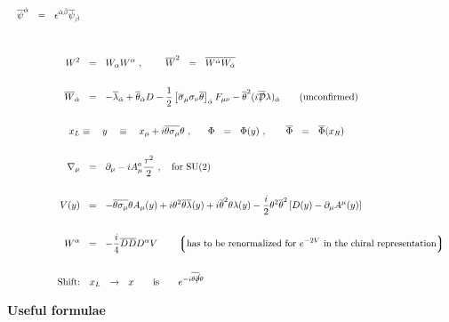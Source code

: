 \documentclass[14pt]{article}
\newcommand{\mc}[1]{\mathcal{#1}}
\newcommand{\ov}{\overline}
\newcommand{\lgr}{\left\lgroup}
\newcommand{\rgr}{\right\rgroup}
\def\slashed#1{\setbox0=\hbox{$#1$}             %
   \dimen0=\wd0                                 %
   \setbox1=\hbox{/} \dimen1=\wd1               %
   \ifdim\dimen0>\dimen1                        %
      \rlap{\hbox to \dimen0{\hfil/\hfil}}      %
      #1                                        %
   \else                                        %
      \rlap{\hbox to \dimen1{\hfil$#1$\hfil}}   %
      /                                         %
   \fi}                                         %
\begin{document}
\begin{align*}
\quad
	    \overline{\psi}^{\dot{\alpha}} ~~=~~ 
			  \epsilon^{\dot{\alpha}\dot{\beta}}
			  \overline{\psi}_{\dot{\beta}}\\ \\
 \\
  W^2 & ~~=~~  W_\alpha W^\alpha~,~~~~~~~ 
    \overline{W}^2 ~~=~~ \overline{W^{\dot{\alpha}} W_{\dot{\alpha}}} \\ \\
  \overline{W}_{\dot{\alpha}} & ~~=~~ 
        - \overline{\lambda}_{\dot{\alpha}} +
	  \overline{\theta}_{\dot{\alpha}} D -
	  \frac{1}{2} \left [ 
	      \overline{\sigma}_\mu\sigma_\nu \overline{\theta}
	              \right ]_{\dot{\alpha}} F_{\mu\nu} -
	  \overline{\theta}^2 (i \ov{\slashed{\mc{D}}}\lambda)_{\dot{\alpha}}
\qquad {\rm (unconfirmed)}  \\ \\
  x_L & \equiv  ~~~y ~~~ 
	\equiv ~~~ x_\mu + i \overline{\theta\sigma_\mu}\theta~,~~~~~
   \Phi ~~=~~ \Phi(y)~,~~~~~~\overline{\Phi} ~~=~~ \overline{\Phi}(x_R) \\ \\
  \nabla_\mu & ~~=~~  \partial_\mu - i A_\mu^a \frac{\tau^2}{2}~,~~~ 
           \text{for SU(2)} \\ \\
  V(y) & ~~=~~  - \overline{\theta\sigma_\mu}\theta A_\mu(y) + 
	    i \theta^2 \overline{\theta\lambda}(y) +
            i \overline{\theta}^2 \theta\lambda(y) -
            \frac{i}{2}\theta^2\overline{\theta}^2
	    \left [ D(y) - \partial_\mu A^\mu(y) \right ] \\ \\
  W^\alpha & ~~=~~ - \frac{i}{4} \overline{DD} D^\alpha V 
  \qquad
  \lgr \text{has to be renormalized for $ e^{-2V} $ in the chiral representation} \rgr
	\\ \\
  \text{Shift:} &\quad x_L ~~\to~~ x  \qquad {\rm is} \qquad e^{-i \ov{\theta\slashed{\partial}}\theta}
\end{align*}


\pagebreak
\renewcommand{\arraystretch}{2.5}

\begin{center}
        {\Large\bf Useful formulae}
\end{center}
\end{document}
